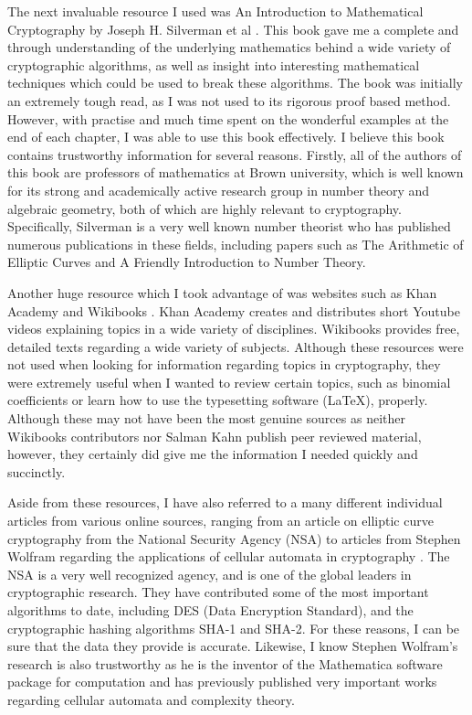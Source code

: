 \documentclass[12pt, a4paper, final]{report}
\begin{document}
The next invaluable resource I used was An Introduction to Mathematical
Cryptography by Joseph H. Silverman et al \cite{silverman}. This book gave me
a complete and through understanding of the underlying mathematics behind
a wide variety of cryptographic algorithms, as well as insight into
interesting mathematical techniques which could be used to break these
algorithms. The book was initially an extremely tough read, as I was not used
to its rigorous proof based method. However, with practise and much time
spent on the wonderful examples at the end of each chapter, I was able to
use this book effectively. I believe this book contains trustworthy information
for several reasons. Firstly, all of the authors of this book are professors of
mathematics at Brown university, which is well known for its strong and
academically active research group in number theory and algebraic geometry,
both of which are highly relevant to cryptography. Specifically, Silverman is
a very well known number theorist who has published numerous publications in
these fields, including papers such as The Arithmetic of Elliptic Curves and
A Friendly Introduction to Number Theory.

Another huge resource which I took advantage of was websites such as
Khan Academy and Wikibooks \cite{khan, wikibooks}. Khan Academy creates
and distributes short Youtube videos explaining topics in a wide variety of
disciplines. Wikibooks provides free, detailed texts regarding a wide variety
of subjects. Although these resources were not used when looking for
information regarding topics in cryptography, they were extremely useful when
I wanted to review certain topics, such as binomial coefficients or learn how
to use the typesetting software ({\LaTeX}), properly. Although these may
not have been the most genuine sources as neither Wikibooks contributors
nor Salman Kahn publish peer reviewed material, however, they certainly did
give me the information I needed quickly and succinctly. %

Aside from these resources, I have also referred to a many different
individual articles from various online sources, ranging from an article on
elliptic curve cryptography from the National Security Agency (NSA) \cite{nsa}
to articles from Stephen Wolfram regarding the applications of cellular
automata in cryptography \cite{wolfram}. The NSA is a very well recognized
agency, and is one of the global leaders in cryptographic research. They have
contributed some of the most important algorithms to date, including DES
(Data Encryption Standard), and the cryptographic hashing algorithms SHA-1
and SHA-2. For these reasons, I can be sure that the data they provide is
accurate. Likewise, I know Stephen Wolfram's research is also trustworthy as
he is the inventor of the Mathematica software package for computation and has
previously published very important works regarding cellular automata and
complexity theory.
\end{document}

